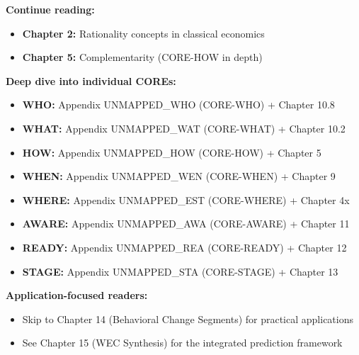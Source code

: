 \begin{tcolorbox}[colback=green!5!white, colframe=green!75!black,
    title=\textbf{Reading Paths from Chapter 1b}]
\small

\textbf{Continue reading:}
\begin{itemize}[nosep]
    \item \textbf{Chapter 2:} Rationality concepts in classical economics
    \item \textbf{Chapter 5:} Complementarity (CORE-HOW in depth)
\end{itemize}

\medskip
\textbf{Deep dive into individual COREs:}
\begin{itemize}[nosep]
    \item \textbf{WHO:} Appendix UNMAPPED_WHO (CORE-WHO) + Chapter 10.8
    \item \textbf{WHAT:} Appendix UNMAPPED_WAT (CORE-WHAT) + Chapter 10.2
    \item \textbf{HOW:} Appendix UNMAPPED_HOW (CORE-HOW) + Chapter 5
    \item \textbf{WHEN:} Appendix UNMAPPED_WEN (CORE-WHEN) + Chapter 9
    \item \textbf{WHERE:} Appendix UNMAPPED_EST (CORE-WHERE) + Chapter 4x
    \item \textbf{AWARE:} Appendix UNMAPPED_AWA (CORE-AWARE) + Chapter 11
    \item \textbf{READY:} Appendix UNMAPPED_REA (CORE-READY) + Chapter 12
    \item \textbf{STAGE:} Appendix UNMAPPED_STA (CORE-STAGE) + Chapter 13
\end{itemize}

\medskip
\textbf{Application-focused readers:}
\begin{itemize}[nosep]
    \item Skip to Chapter 14 (Behavioral Change Segments) for practical applications
    \item See Chapter 15 (WEC Synthesis) for the integrated prediction framework
\end{itemize}
\end{tcolorbox}

